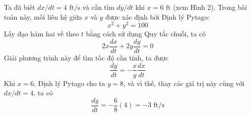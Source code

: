 \begin{minipage}[t]{360pt}
  \vspace{3pt}
  Ta đã biết $dx/dt = 4\text{ ft/s}$ và cần tìm $dy/dt$ khi $x = 6\text{ ft}$ (xem Hình 2). Trong bài toán này, mối liên hệ giữa $x$ và $y$ được xác định bởi Định lý Pytago:
  \[
  x^2 + y^2 = 100
  \]
  Lấy đạo hàm hai vế theo $t$ bằng cách sử dụng Quy tắc chuỗi, ta có
  \[
  2x \frac{dx}{dt} + 2y \frac{dy}{dt} = 0
  \]
  Giải phương trình này để tìm tốc độ cần tính, ta được
  \[
  \frac{dy}{dt} = -\frac{x}{y}\frac{dx}{dt}
  \]
  Khi $x = 6$, Định lý Pytago cho ta $y = 8$, và vì thế, thay các giá trị này cùng với $dx/dt = 4$, ta có
  \[
  \frac{dy}{dt} = -\frac{6}{8}(4) = -3\text{ ft/s}
  \]
\end{minipage}
